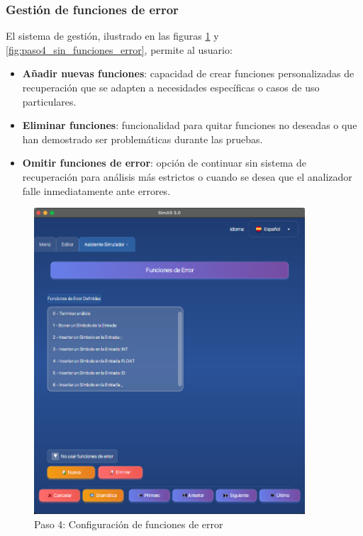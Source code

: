 \subsubsection{Gestión de funciones de error}

El sistema de gestión, ilustrado en las figuras \ref{fig:paso4_funciones_error} y \ref{fig:paso4_sin_funciones_error}, permite al usuario:

\begin{itemize}
    \item \textbf{Añadir nuevas funciones}: capacidad de crear funciones personalizadas de recuperación que se adapten a necesidades específicas o casos de uso particulares.
    \item \textbf{Eliminar funciones}: funcionalidad para quitar funciones no deseadas o que han demostrado ser problemáticas durante las pruebas.
    \item \textbf{Omitir funciones de error}: opción de continuar sin sistema de recuperación para análisis más estrictos o cuando se desea que el analizador falle inmediatamente ante errores.
\end{itemize}

\needspace{8cm}
\begin{figure}[H]
    \centering
    \includegraphics[width=0.9\textwidth]{figuras/simulador/paso4_funcionesError.png}
    \caption{Paso 4: Configuración de funciones de error}
    \label{fig:paso4_funciones_error}
\end{figure}

